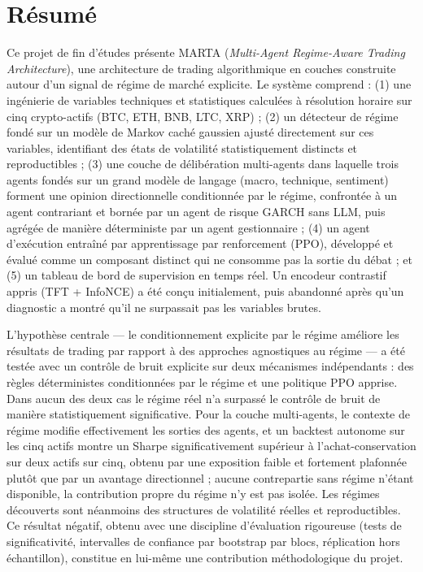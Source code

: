 \chapter*{Résumé}

Ce projet de fin d'études présente MARTA (\emph{Multi-Agent Regime-Aware Trading Architecture}), une architecture de trading algorithmique en couches construite autour d'un signal de régime de marché explicite. Le système comprend : (1) une ingénierie de variables techniques et statistiques calculées à résolution horaire sur cinq crypto-actifs (BTC, ETH, BNB, LTC, XRP) ; (2) un détecteur de régime fondé sur un modèle de Markov caché gaussien ajusté directement sur ces variables, identifiant des états de volatilité statistiquement distincts et reproductibles ; (3) une couche de délibération multi-agents dans laquelle trois agents fondés sur un grand modèle de langage (macro, technique, sentiment) forment une opinion directionnelle conditionnée par le régime, confrontée à un agent contrariant et bornée par un agent de risque GARCH sans LLM, puis agrégée de manière déterministe par un agent gestionnaire ; (4) un agent d'exécution entraîné par apprentissage par renforcement (PPO), développé et évalué comme un composant distinct qui ne consomme pas la sortie du débat ; et (5) un tableau de bord de supervision en temps réel. Un encodeur contrastif appris (TFT + InfoNCE) a été conçu initialement, puis abandonné après qu'un diagnostic a montré qu'il ne surpassait pas les variables brutes.

L'hypothèse centrale --- le conditionnement explicite par le régime améliore les résultats de trading par rapport à des approches agnostiques au régime --- a été testée avec un contrôle de bruit explicite sur deux mécanismes indépendants : des règles déterministes conditionnées par le régime et une politique PPO apprise. Dans aucun des deux cas le régime réel n'a surpassé le contrôle de bruit de manière statistiquement significative. Pour la couche multi-agents, le contexte de régime modifie effectivement les sorties des agents, et un backtest autonome sur les cinq actifs montre un Sharpe significativement supérieur à l'achat-conservation sur deux actifs sur cinq, obtenu par une exposition faible et fortement plafonnée plutôt que par un avantage directionnel ; aucune contrepartie sans régime n'étant disponible, la contribution propre du régime n'y est pas isolée. Les régimes découverts sont néanmoins des structures de volatilité réelles et reproductibles. Ce résultat négatif, obtenu avec une discipline d'évaluation rigoureuse (tests de significativité, intervalles de confiance par bootstrap par blocs, réplication hors échantillon), constitue en lui-même une contribution méthodologique du projet.

